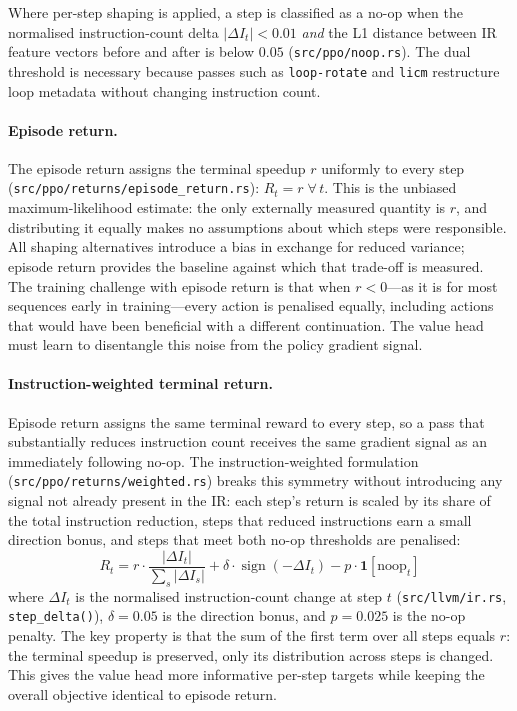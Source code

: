 \documentclass[conference]{IEEEtran}
\newcommand{\pass}[1]{\texttt{#1}}
\begin{document}
Where per-step shaping is applied, a step is classified as a no-op when the
normalised instruction-count delta $|\Delta I_t| < 0.01$ \emph{and} the L1
distance between IR feature vectors before and after is below $0.05$
(\texttt{src/ppo/noop.rs}).
The dual threshold is necessary because passes such as \pass{loop-rotate}
and \pass{licm} restructure loop metadata without changing instruction count.

\paragraph{Episode return.}
The episode return assigns the terminal speedup $r$ uniformly to every
step (\texttt{src/ppo/returns/episode\_return.rs}):
$R_t = r \;\forall\, t$.
This is the unbiased maximum-likelihood estimate: the only externally
measured quantity is $r$, and distributing it equally makes no assumptions
about which steps were responsible.
All shaping alternatives introduce a bias in exchange for reduced variance;
episode return provides the baseline against which that trade-off is measured.
The training challenge with episode return is that when $r < 0$---as it is
for most sequences early in training---every action is penalised equally,
including actions that would have been beneficial with a different
continuation.
The value head must learn to disentangle this noise from the policy gradient
signal.

\paragraph{Instruction-weighted terminal return.}
Episode return assigns the same terminal reward to every step, so a pass
that substantially reduces instruction count receives the same gradient
signal as an immediately following no-op.
The instruction-weighted formulation
(\texttt{src/ppo/returns/weighted.rs}) breaks this
symmetry without introducing any signal not already present in the IR:
each step's return is scaled by its share of the total instruction
reduction, steps that reduced instructions earn a small direction bonus,
and steps that meet both no-op thresholds are penalised:
%
\begin{equation}
R_t = r \cdot \frac{|\Delta I_t|}{\sum_s |\Delta I_s|}
      + \delta \cdot \operatorname{sign}(-\Delta I_t)
      - p \cdot \mathbf{1}[\text{noop}_t]
\label{eq:weightedreturn}
\end{equation}
%
where $\Delta I_t$ is the normalised instruction-count change at step $t$
(\texttt{src/llvm/ir.rs}, \texttt{step\_delta()}),
$\delta = 0.05$ is the direction bonus, and $p = 0.025$ is the no-op
penalty.
The key property is that the sum of the first term over all steps equals $r$:
the terminal speedup is preserved, only its distribution across steps is
changed.
This gives the value head more informative per-step targets while keeping
the overall objective identical to episode return.
\end{document}
